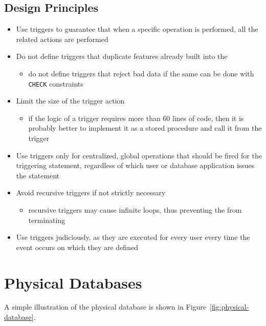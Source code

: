 \documentclass[english]{article}
\begin{document}
\subsection{Design Principles}

\begin{itemize}
  \item Use triggers to guarantee that when a specific operation is performed, all the related actions are performed
  \item Do not define triggers that duplicate features already built into the \dbms
        \begin{itemize}[label=\(\rightarrow\)]
          \item do not define triggers that reject bad data if the same can be done with \sql \texttt{CHECK} constraints
        \end{itemize}
  \item Limit the size of the trigger action
        \begin{itemize}[label=\(\rightarrow\)]
          \item if the logic of a trigger requires more than \(60\) lines of code, then it is probably better to implement it as a stored procedure and call it from the trigger
        \end{itemize}
  \item Use triggers only for centralized, global operations that should be fired for the triggering statement, regardless of which user or database application issues the statement
  \item Avoid recursive triggers if not strictly necessary
        \begin{itemize}[label=\(\rightarrow\)]
          \item recursive triggers may cause infinite loops, thus preventing the \dbms from terminating
        \end{itemize}
  \item Use triggers judiciously, as they are executed for every user every time the event occurs on which they are defined
\end{itemize}

\clearpage

\section{Physical Databases}

A simple illustration of the physical database is shown in Figure~\ref{fig:physical-database}.
\end{document}
